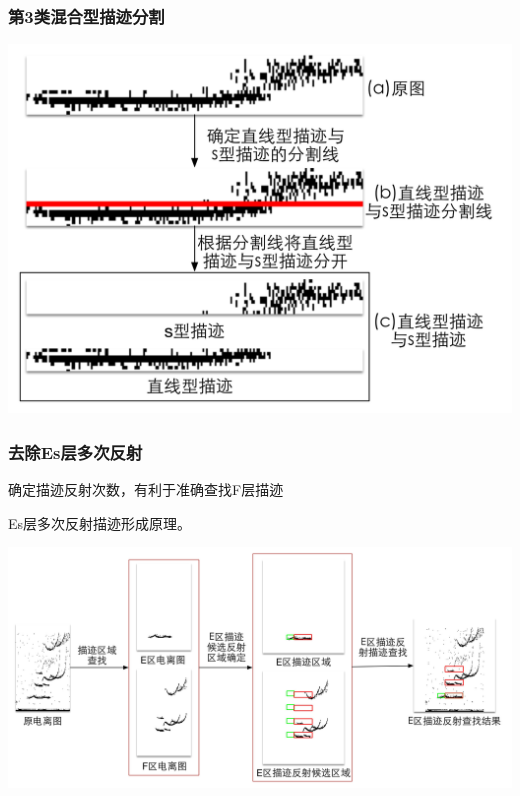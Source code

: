 \documentclass[notheorems,mathserif,table,compress]{beamer}  %
\begin{document}
\begin{frame}
\frametitle{ 第3类\textbf{混合型}描迹分割}
\centering\includegraphics[width=0.8\linewidth]{第2类描迹细分结果.png}
\end{frame}

\begin{frame}
\frametitle{ 去除Es层多次反射}
\begin{tcolorbox}[colback=blue!5,colframe=blue!75!black]
\begin{description}
\vspace{-0.2em}
\addtolength{\itemindent}{-4em}
\item[目的] 确定描迹反射次数，有利于准确查找F层描迹
\item[依据] Es层多次反射描迹形成原理。
\vspace{-0.5em}
\end{description}
\end{tcolorbox}
\centering\includegraphics[width=0.9\linewidth]{E区描迹多次反射.png}
\end{frame}
\end{document}
